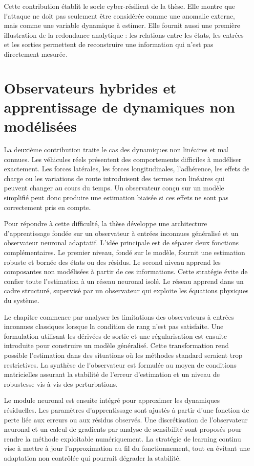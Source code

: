 Cette contribution établit le socle cyber-résilient de la thèse. Elle montre que l'attaque ne doit pas seulement être considérée comme une anomalie externe, mais comme une variable dynamique à estimer. Elle fournit aussi une première illustration de la redondance analytique : les relations entre les états, les entrées et les sorties permettent de reconstruire une information qui n'est pas directement mesurée.

\section*{Observateurs hybrides et apprentissage de dynamiques non modélisées}

La deuxième contribution traite le cas des dynamiques non linéaires et mal connues. Les véhicules réels présentent des comportements difficiles à modéliser exactement. Les forces latérales, les forces longitudinales, l'adhérence, les effets de charge ou les variations de route introduisent des termes non linéaires qui peuvent changer au cours du temps. Un observateur conçu sur un modèle simplifié peut donc produire une estimation biaisée si ces effets ne sont pas correctement pris en compte.

Pour répondre à cette difficulté, la thèse développe une architecture d'apprentissage fondée sur un observateur à entrées inconnues généralisé et un observateur neuronal adaptatif. L'idée principale est de séparer deux fonctions complémentaires. Le premier niveau, fondé sur le modèle, fournit une estimation robuste et bornée des états ou des résidus. Le second niveau apprend les composantes non modélisées à partir de ces informations. Cette stratégie évite de confier toute l'estimation à un réseau neuronal isolé. Le réseau apprend dans un cadre structuré, supervisé par un observateur qui exploite les équations physiques du système.

Le chapitre commence par analyser les limitations des observateurs à entrées inconnues classiques lorsque la condition de rang n'est pas satisfaite. Une formulation utilisant les dérivées de sortie et une régularisation est ensuite introduite pour construire un modèle généralisé. Cette transformation rend possible l'estimation dans des situations où les méthodes standard seraient trop restrictives. La synthèse de l'observateur est formulée au moyen de conditions matricielles assurant la stabilité de l'erreur d'estimation et un niveau de robustesse vis-à-vis des perturbations.

Le module neuronal est ensuite intégré pour approximer les dynamiques résiduelles. Les paramètres d'apprentissage sont ajustés à partir d'une fonction de perte liée aux erreurs ou aux résidus observés. Une discrétisation de l'observateur neuronal et un calcul de gradients par analyse de sensibilité sont proposés pour rendre la méthode exploitable numériquement. La stratégie de learning continu vise à mettre à jour l'approximation au fil du fonctionnement, tout en évitant une adaptation non contrôlée qui pourrait dégrader la stabilité.

